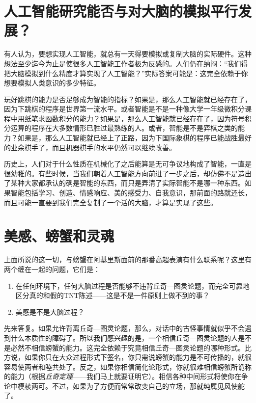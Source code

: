 \section{人工智能研究能否与对大脑的模拟平行发展？}

有人认为，要想实现人工智能，就总有一天得要模拟或复制大脑的实际硬件。这种想法至少迄今为止是使很多人工智能工作者极为反感的。人们仍在纳闷：“我们得把大脑模拟到什么精度才算实现了人工智能？”实际答案可能是：这完全依赖于你想要模拟人类意识的多少特征。

玩好跳棋的能力是否足够成为智能的指标？如果是，那么人工智能就已经存在了，因为下跳棋的程序是世界第一流水平。或者智能是不是一种像大学一年级微积分课程中用纸笔求函数积分的能力？如果是，那么人工智能就已经存在了，因为符号积分运算的程序在大多数情形已胜过最熟练的人。或者，智能是不是弈棋之类的能力？如果是，那么人工智能就已经上了正路，因为下国际象棋的程序已能战胜最好的业余棋手了，而且机器棋手的水平仍然可以继续改善。

历史上，人们对于什么性质在机械化了之后能算是无可争议地构成了智能，一直是很幼稚的。有些时候，当我们朝着人工智能方向前进了一步之后，却仿佛不是造出了某种大家都承认的确是智能的东西，而只是弄清了实际智能不是哪一种东西。如果智能包括学习、创造、情感响应、美的感受力、自我意识，那前面的路就还长，而且可能一直要到我们完全复制了一个活的大脑，才算是实现了这些。

\section{美感、螃蟹和灵魂}

上面所说的这一切，与螃蟹在阿基里斯面前的那番高超表演有什么联系呢？这里有两个缠在一起的问题，它们是：
\begin{enumerate}
\item 在任何环境下，任何大脑过程是否能够不违背丘奇—图灵论题，而完全可靠地区分真的和假的TNT陈述——这是不是一件原则上做不到的事？
\item 美感是不是大脑过程？
\end{enumerate}

先来答复。如果允许背离丘奇—图灵论题，那么，对话中的古怪事情就似乎不会遇到什么本质性的障碍了。所以我们感兴趣的是，一个相信丘奇—图灵论题的人是不是必然不相信螃蟹的能力。这完全依赖于究竟相信丘奇—图灵论题的哪种形式。比方说，如果你只在大众过程形式下签名，你只需说螃蟹的能力是不可传播的，就很容易使两者和睦共处了。反之，如果你相信简化论形式，你就很难相信螃蟹所诡称的能力（根据\emph{丘奇定理}——我们马上就要证明它）。相信各种中间形式将使你在争论中模棱两可。不过，如果为了方便而常常改变自己的立场，那就纯属见风使舵了。

